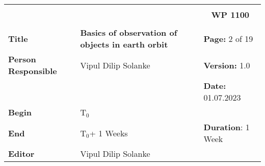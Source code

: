 \begin{table}[!h]
  \begin{center}
    \begin{tabular}{|p{35mm}||p{55mm}|p{50mm}||p{40mm}|}
      \hline
      \multicolumn{3}{|l||}{\textbf{}} & \multicolumn{1}{c|}{}                                                                                                                                                \\
      \multicolumn{3}{|l||}{\textbf{}} & \multicolumn{1}{c|}{\textbf{WP 1100}}                                                                                                                                \\
      \multicolumn{3}{|l||}{\textbf{}} & \multicolumn{1}{c|}{}                                                                                                                                                \\
      \hline\hline
      \textbf{Title}                   & \multicolumn{2}{p{7cm}||}{\textbf{Basics of observation of objects in earth orbit}}
                                       & \textbf{Page:} 2 of 19                                                                                                                                             \\
      \hline
      \textbf{Person Responsible}        & \multicolumn{2}{l||}{Vipul Dilip Solanke}                                                                                                   & \textbf{Version:} 1.0   \\
      \hline
      \multicolumn{3}{|l||}{}          & \textbf{Date:} 01.07.2023                                                                                                                                          \\
      \hline\hline
      \textbf{Begin}                  & \multicolumn{2}{l||}{T$_0$}                                                                                                                &                         \\
      \hline
      \textbf{End}                    & \multicolumn{2}{l||}{T$_0$+ 1 Weeks}                                                                                                        & \textbf{Duration}: 1 Week \\
      \hline\hline
      \textbf{Editor}              & \multicolumn{3}{l|}{Vipul Dilip Solanke}                                                                                                                              \\

\end{tabular}
\end{center}
\end{table}
